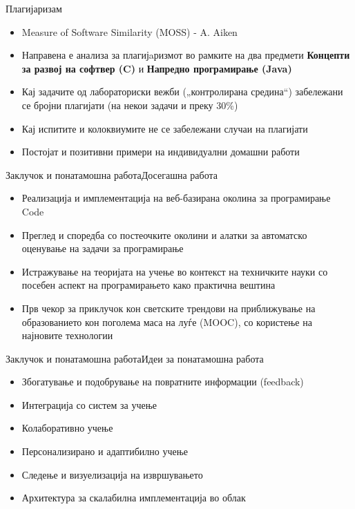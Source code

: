 \begin{frame}{Плагијаризам}
\begin{itemize}
  \item Measure of Software Similarity (MOSS) - A. Aiken
  \item Направена е анализа за плагијaризмот во рамките на два предмети \textbf{Концепти за
развој на софтвер (C)} и \textbf{Напредно програмирање (Java)}
    \item Кај задачите од лабораториски вежби („контролирана средина“)
забележани се бројни плагијати (на некои задачи и преку 30\%)
    \item Кај испитите и колоквиумите не се забележани случаи на плагијати
    \item Постојат и позитивни примери на индивидуални домашни работи
\end{itemize}
\end{frame}

\begin{frame}{Заклучок и понатамошна работа}{Досегашна работа}
    \begin{itemize}
      \item Реализација и имплементација на веб-базирана околина за
      програмирање Code
      \item Преглед и споредба со постеочките околини и алатки за
      автоматско оценување на задачи за програмирање
      \item Истражување на теоријата на учење во контекст на техничките науки со
      посебен аспект на програмирањето како практична вештина
      \item Прв чекор за  приклучок кон светските трендови на приближување
      на образованието кон поголема маса на луѓе (MOOC), со користење на
      најновите технологии
    \end{itemize}
\end{frame}



\begin{frame}{Заклучок и понатамошна работа}{Идеи за понатамошна работа}
\begin{itemize}
  \item Збогатување и подобрување на повратните информации (feedback)
  \item Интеграција со систем за учење
  \item Колаборативно учење
  \item Персонализирано и адаптибилно учење
  \item Следење и визуелизација на извршувањето
  \item Архитектура за скалабилна имплементација во облак
\end{itemize}
\end{frame}

